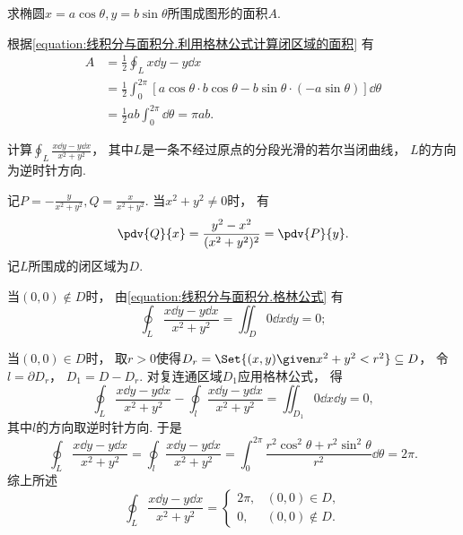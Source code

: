 \begin{example}
求椭圆\(x = a \cos\theta, y = b \sin\theta\)所围成图形的面积\(A\).
\begin{solution}
根据\cref{equation:线积分与面积分.利用格林公式计算闭区域的面积} 有
\begin{align*}
	A &= \frac{1}{2} \oint_L x\dd{y}-y\dd{x} \\
	&= \frac{1}{2} \int_0^{2\pi}
		\left[
			a \cos\theta \cdot b \cos\theta
			- b \sin\theta \cdot (-a \sin\theta)
		\right] \dd{\theta} \\
	&= \frac{1}{2} ab \int_0^{2\pi} \dd{\theta}
	= \pi ab.
\end{align*}
\end{solution}
\end{example}

\begin{example}
计算\(\oint_L \frac{x\dd{y}-y\dd{x}}{x^2+y^2}\)，
其中\(L\)是一条不经过原点的分段光滑的若尔当闭曲线，
\(L\)的方向为逆时针方向.
\begin{solution}
记\(P = -\frac{y}{x^2+y^2}, Q = \frac{x}{x^2+y^2}\).
当\(x^2+y^2\neq0\)时，
有\begin{equation*}
	\pdv{Q}{x} = \frac{y^2-x^2}{(x^2+y^2)^2} = \pdv{P}{y}.
\end{equation*}
记\(L\)所围成的闭区域为\(D\).

当\((0,0) \notin D\)时，
由\cref{equation:线积分与面积分.格林公式} 有\begin{equation*}
	\oint_L \frac{x\dd{y}-y\dd{x}}{x^2+y^2} = \iint_D 0 \dd{x}\dd{y} = 0;
\end{equation*}

当\((0,0) \in D\)时，
取\(r>0\)使得\(D_r = \Set{ (x,y) \given x^2+y^2 < r^2 } \subseteq D\)，
令\(l = \partial D_r\)，
\(D_1 = D - D_r\).
对复连通区域\(D_1\)应用格林公式，
得\begin{equation*}
	\oint_L \frac{x\dd{y}-y\dd{x}}{x^2+y^2} - \oint_l \frac{x\dd{y}-y\dd{x}}{x^2+y^2}
	= \iint_{D_1} 0 \dd{x}\dd{y} = 0,
\end{equation*}
其中\(l\)的方向取逆时针方向.
于是\begin{equation*}
	\oint_L \frac{x\dd{y}-y\dd{x}}{x^2+y^2}
	= \oint_l \frac{x\dd{y}-y\dd{x}}{x^2+y^2}
	= \int_0^{2\pi} \frac{r^2 \cos^2\theta + r^2 \sin^2\theta}{r^2} \dd{\theta}
	= 2\pi.
\end{equation*}
综上所述\begin{equation*}
	\oint_L \frac{x\dd{y}-y\dd{x}}{x^2+y^2}
	= \begin{cases}
		2\pi, & (0,0) \in D, \\
		0, & (0,0) \notin D.
	\end{cases}
\end{equation*}
\end{solution}
\end{example}

